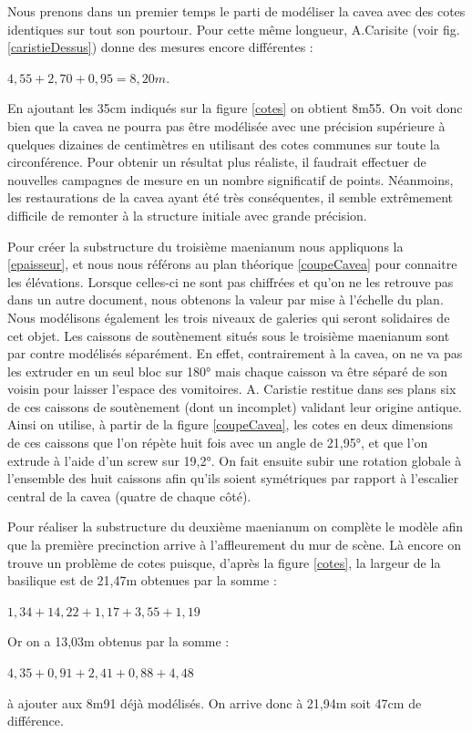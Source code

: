 Nous prenons dans un premier temps le parti de modéliser la  \gls{cavea} avec des cotes identiques sur tout son pourtour. Pour cette même longueur, A.Carisite (voir fig. \ref{caristieDessus}) donne des mesures encore différentes : 
\begin{center}
$4,55+2,70+0,95=8,20m$.
\end{center}
En ajoutant les 35cm indiqués sur la figure \ref{cotes} on obtient 8m55. On voit donc bien que la \gls{cavea} ne pourra pas être modélisée avec une précision supérieure à quelques dizaines de centimètres en utilisant des cotes communes sur toute la circonférence. Pour obtenir un résultat plus réaliste, il faudrait effectuer de nouvelles campagnes de mesure en un nombre significatif de points. Néanmoins, les restaurations de la \gls{cavea} ayant été très conséquentes, il semble extrêmement difficile de remonter à la structure initiale avec grande précision.

Pour créer la substructure du troisième \gls{maenianum} nous appliquons la \ref{epaisseur}, et nous nous référons au plan théorique \ref{coupeCavea} pour connaitre les élévations. Lorsque celles-ci ne sont pas chiffrées et qu'on ne les retrouve pas dans un autre document, nous obtenons la valeur par mise à l'échelle du plan. Nous modélisons également les trois niveaux de galeries qui seront solidaires de cet objet. Les caissons de soutènement situés sous le troisième \gls{maenianum} sont par contre modélisés séparément. En effet, contrairement à la \gls{cavea}, on ne va pas les extruder en un seul bloc sur 180° mais chaque caisson va être séparé de son voisin pour laisser l'espace des vomitoires. A. Caristie restitue dans ses plans six de ces caissons de soutènement (dont un incomplet) validant leur origine antique. Ainsi on utilise, à partir de la figure \ref{coupeCavea}, les cotes en deux dimensions de ces caissons que l'on répète huit fois avec un angle de 21,95°, et que l'on extrude à l'aide d'un \gls{screw} sur 19,2°. On fait ensuite subir une rotation globale à l'ensemble des huit caissons afin qu'ils soient symétriques par rapport à l'escalier central de la \gls{cavea} (quatre de chaque côté). 

Pour réaliser la substructure du deuxième \gls{maenianum} on complète le modèle afin que la première \gls{precinction} arrive à l'affleurement du mur de scène. Là encore on trouve un problème de cotes puisque, d'après la figure \ref{cotes}, la largeur de la basilique est de 21,47m obtenues par la somme :
\begin{center}
$1,34+14,22+1,17+3,55+1,19$
\end{center}
Or on a 13,03m obtenus par la somme : 
\begin{center}
$4,35+0,91+2,41+0,88+4,48$
\end{center}
à ajouter aux 8m91 déjà modélisés. On arrive donc à 21,94m soit 47cm de différence. 


